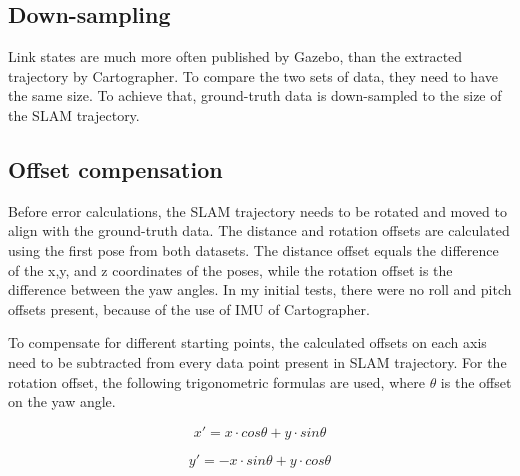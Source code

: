 \subsection{Down-sampling}
Link states are much more often published by Gazebo, than the extracted trajectory by Cartographer.
To compare the two sets of data, they need to have the same size. To achieve that, ground-truth
data is down-sampled to the size of the SLAM trajectory.

\subsection{Offset compensation}
Before error calculations, the SLAM trajectory needs to be rotated and moved to align with the
ground-truth data. The distance and rotation offsets are calculated using the first pose from both
datasets. The distance offset equals the difference of the x,y, and z coordinates of the poses,
while the rotation offset is the difference between the yaw angles. In my initial tests, there were
no roll and pitch offsets present, because of the use of IMU of Cartographer.

To compensate for different starting points, the calculated offsets on each axis need to be
subtracted from every data point present in SLAM trajectory. For the rotation offset, the
following trigonometric formulas are used, where $\theta$ is the offset on the yaw angle.

\begin{equation}\label{eq:rotation_x}
    x'=x\cdot cos\theta + y\cdot sin\theta   
\end{equation}

\begin{equation}\label{eq:rotation_y}
    y'=-x\cdot sin\theta + y \cdot cos\theta
\end{equation}

